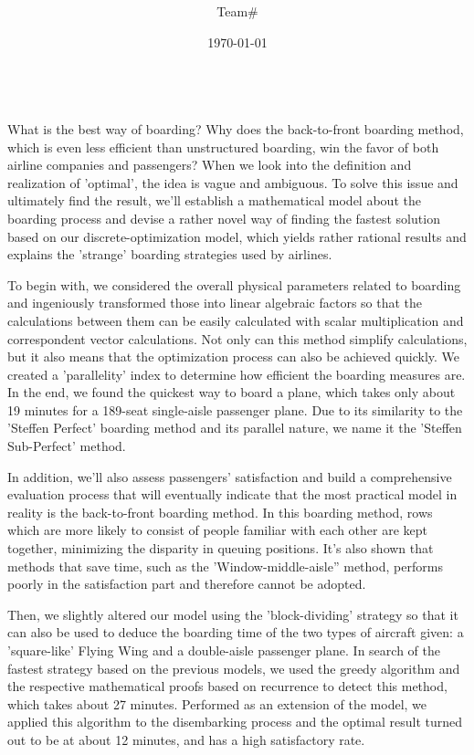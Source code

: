 \documentclass{article}
\title{\Huge\textbf{\Title}}
\author{Team\#\Team}
\date{\today}
\theoremstyle{definition}
\theoremstyle{remark}
\numberwithin{equation}{section}
\begin{document}
	\normalfont{}\selectfont

	\qquad
	\par
	~~
	\\[2cm]
	What is the best way of boarding? Why does the back-to-front boarding method, which is even less efficient than unstructured boarding, win the favor of both airline companies and passengers? When we look into the definition and realization of 'optimal', the idea is vague and ambiguous. To solve this issue and ultimately find the result, we'll establish a mathematical model about the boarding process and devise a rather novel way of finding the fastest solution based on our discrete-optimization model, which yields rather rational results and explains the 'strange' boarding strategies used by airlines.

	To begin with, we considered the overall physical parameters related to boarding and ingeniously transformed those into linear algebraic factors so that the calculations between them can be easily calculated with scalar multiplication and correspondent vector calculations. Not only can this method simplify calculations, but it also means that the optimization process can also be achieved quickly. We created a 'parallelity' index to determine how efficient the boarding measures are. In the end, we found the quickest way to board a plane, which takes only about 19 minutes for a 189-seat single-aisle passenger plane. Due to its similarity to the 'Steffen Perfect' boarding method and its parallel nature, we name it the 'Steffen Sub-Perfect' method.

	In addition, we'll also assess passengers' satisfaction and build a comprehensive evaluation process that will eventually indicate that the most practical model in reality is the back-to-front boarding method. In this boarding method, rows which are more likely to consist of people familiar with each other are kept together, minimizing the disparity in queuing positions. It's also shown that methods that save time, such as the 'Window-middle-aisle'' method, performs poorly in the satisfaction part and therefore cannot be adopted.

	Then, we slightly altered our model using the 'block-dividing' strategy so that it can also be used to deduce the boarding time of the two types of aircraft given: a 'square-like' Flying Wing and a double-aisle passenger plane. In search of the fastest strategy based on the previous models, we used the greedy algorithm and the respective mathematical proofs based on recurrence to detect this method, which takes about 27 minutes. Performed as an extension of the model, we applied this algorithm to the disembarking process and the optimal result turned out to be at about 12 minutes, and has a high satisfactory rate.
\end{document}
